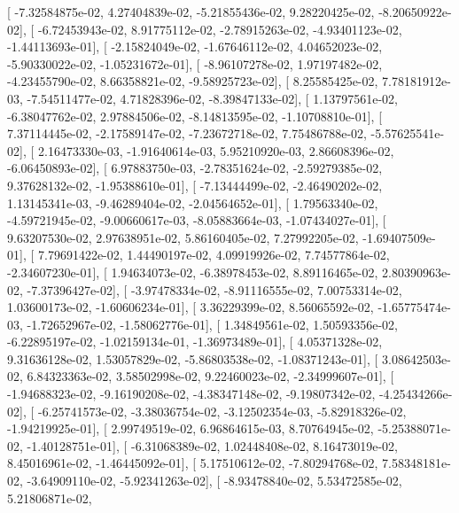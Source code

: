 \documentclass{article}
\begin{document}
       [ -7.32584875e-02,   4.27404839e-02,  -5.21855436e-02,
          9.28220425e-02,  -8.20650922e-02],
       [ -6.72453943e-02,   8.91775112e-02,  -2.78915263e-02,
         -4.93401123e-02,  -1.44113693e-01],
       [ -2.15824049e-02,  -1.67646112e-02,   4.04652023e-02,
         -5.90330022e-02,  -1.05231672e-01],
       [ -8.96107278e-02,   1.97197482e-02,  -4.23455790e-02,
          8.66358821e-02,  -9.58925723e-02],
       [  8.25585425e-02,   7.78181912e-03,  -7.54511477e-02,
          4.71828396e-02,  -8.39847133e-02],
       [  1.13797561e-02,  -6.38047762e-02,   2.97884506e-02,
         -8.14813595e-02,  -1.10708810e-01],
       [  7.37114445e-02,  -2.17589147e-02,  -7.23672718e-02,
          7.75486788e-02,  -5.57625541e-02],
       [  2.16473330e-03,  -1.91640614e-03,   5.95210920e-03,
          2.86608396e-02,  -6.06450893e-02],
       [  6.97883750e-03,  -2.78351624e-02,  -2.59279385e-02,
          9.37628132e-02,  -1.95388610e-01],
       [ -7.13444499e-02,  -2.46490202e-02,   1.13145341e-03,
         -9.46289404e-02,  -2.04564652e-01],
       [  1.79563340e-02,  -4.59721945e-02,  -9.00660617e-03,
         -8.05883664e-03,  -1.07434027e-01],
       [  9.63207530e-02,   2.97638951e-02,   5.86160405e-02,
          7.27992205e-02,  -1.69407509e-01],
       [  7.79691422e-02,   1.44490197e-02,   4.09919926e-02,
          7.74577864e-02,  -2.34607230e-01],
       [  1.94634073e-02,  -6.38978453e-02,   8.89116465e-02,
          2.80390963e-02,  -7.37396427e-02],
       [ -3.97478334e-02,  -8.91116555e-02,   7.00753314e-02,
          1.03600173e-02,  -1.60606234e-01],
       [  3.36229399e-02,   8.56065592e-02,  -1.65775474e-03,
         -1.72652967e-02,  -1.58062776e-01],
       [  1.34849561e-02,   1.50593356e-02,  -6.22895197e-02,
         -1.02159134e-01,  -1.36973489e-01],
       [  4.05371328e-02,   9.31636128e-02,   1.53057829e-02,
         -5.86803538e-02,  -1.08371243e-01],
       [  3.08642503e-02,   6.84323363e-02,   3.58502998e-02,
          9.22460023e-02,  -2.34999607e-01],
       [ -1.94688323e-02,  -9.16190208e-02,  -4.38347148e-02,
         -9.19807342e-02,  -4.25434266e-02],
       [ -6.25741573e-02,  -3.38036754e-02,  -3.12502354e-03,
         -5.82918326e-02,  -1.94219925e-01],
       [  2.99749519e-02,   6.96864615e-03,   8.70764945e-02,
         -5.25388071e-02,  -1.40128751e-01],
       [ -6.31068389e-02,   1.02448408e-02,   8.16473019e-02,
          8.45016961e-02,  -1.46445092e-01],
       [  5.17510612e-02,  -7.80294768e-02,   7.58348181e-02,
         -3.64909110e-02,  -5.92341263e-02],
       [ -8.93478840e-02,   5.53472585e-02,   5.21806871e-02,
\end{document}
